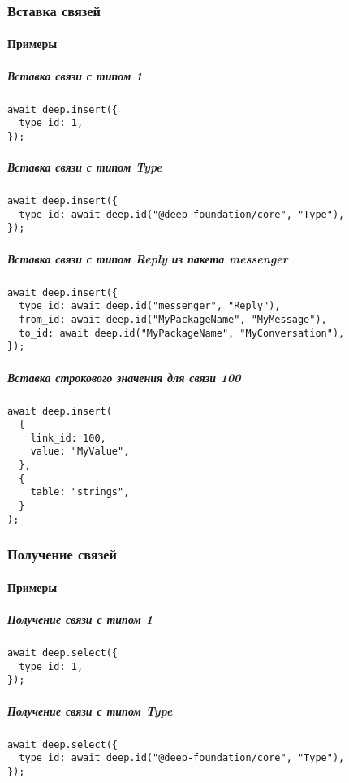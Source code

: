 \documentclass{article}
\begin{document}
\subsubsection{Вставка связей}

\paragraph{Примеры}

\subparagraph{Вставка связи с типом 1}
\leavevmode
\begin{lstlisting}
await deep.insert({
  type_id: 1,
});
\end{lstlisting}

\subparagraph{Вставка связи с типом Type}
\leavevmode
\begin{lstlisting}
await deep.insert({
  type_id: await deep.id("@deep-foundation/core", "Type"),
});
\end{lstlisting}

\subparagraph{Вставка связи с типом Reply из пакета messenger}
\leavevmode
\begin{lstlisting}
await deep.insert({
  type_id: await deep.id("messenger", "Reply"),
  from_id: await deep.id("MyPackageName", "MyMessage"),
  to_id: await deep.id("MyPackageName", "MyConversation"),
});
\end{lstlisting}

\subparagraph{Вставка строкового значения для связи 100}
\leavevmode
\begin{lstlisting}
await deep.insert(
  {
    link_id: 100,
    value: "MyValue",
  },
  {
    table: "strings",
  }
);
\end{lstlisting}

\subsubsection{Получение связей}

\paragraph{Примеры}

\subparagraph{Получение связи с типом 1}
\leavevmode
\begin{lstlisting}
await deep.select({
  type_id: 1,
});
\end{lstlisting}

\subparagraph{Получение связи с типом Type}
\leavevmode
\begin{lstlisting}
await deep.select({
  type_id: await deep.id("@deep-foundation/core", "Type"),
});
\end{lstlisting}
\end{document}
